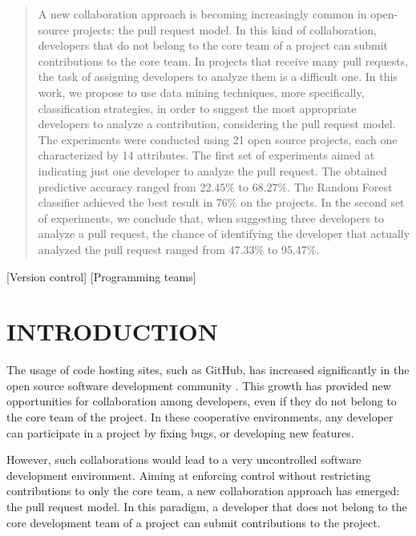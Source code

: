 \documentclass{sig-alternate}
\begin{document}
\begin{abstract}
A new collaboration approach is becoming increasingly common in open-source projects: the pull request model. In this kind of collaboration, developers that do not belong to the core team of a project can submit contributions to the core team. In projects that receive many pull requests, the task of assigning developers to analyze them is a difficult one. In this work, we propose to use data mining techniques, more specifically, classification strategies, in order to suggest the most appropriate developers to analyze a contribution, considering the pull request model. The experiments were conducted using 21 open source projects, each one characterized by 14 attributes. The first set of experiments aimed at indicating just one developer to analyze the pull request. The obtained predictive accuracy ranged from 22.45\% to 68.27\%. The Random Forest classifier achieved the best result in 76\% on the projects. In the second set of experiments, we conclude that, when suggesting three developers to analyze a pull request, the chance of identifying the developer that actually analyzed the pull request ranged from 47.33\% to 95.47\%.
\end{abstract}
[Version control]
[Programming teams]

\section{INTRODUCTION}
The usage of code hosting sites, such as GitHub, has increased significantly in the open source software development community \cite{briandoll_10_Million}. This growth has provided new opportunities for collaboration among developers, even if they do not belong to the core team of the project. In these cooperative environments, any developer can participate in a project by fixing bugs, or developing new features.

However, such collaborations would lead to a very uncontrolled software development environment. Aiming at enforcing control without restricting contributions to only the core team, a new collaboration approach has emerged: the pull request model. In this paradigm, a developer that does not belong to the core development team of a project can submit contributions to the project.
\end{document}
